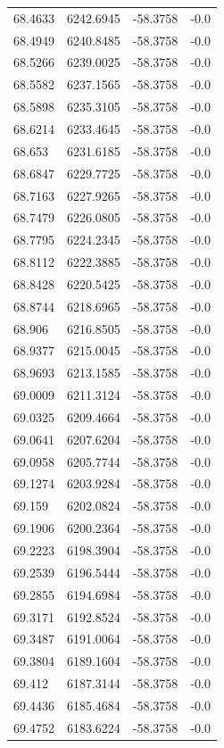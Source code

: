 \begin{table}[H]
\begin{tabular}{llll}
68.4633 & 6242.6945 & -58.3758 & -0.0 \\
68.4949 & 6240.8485 & -58.3758 & -0.0 \\
68.5266 & 6239.0025 & -58.3758 & -0.0 \\
68.5582 & 6237.1565 & -58.3758 & -0.0 \\
68.5898 & 6235.3105 & -58.3758 & -0.0 \\
68.6214 & 6233.4645 & -58.3758 & -0.0 \\
68.653 & 6231.6185 & -58.3758 & -0.0 \\
68.6847 & 6229.7725 & -58.3758 & -0.0 \\
68.7163 & 6227.9265 & -58.3758 & -0.0 \\
68.7479 & 6226.0805 & -58.3758 & -0.0 \\
68.7795 & 6224.2345 & -58.3758 & -0.0 \\
68.8112 & 6222.3885 & -58.3758 & -0.0 \\
68.8428 & 6220.5425 & -58.3758 & -0.0 \\
68.8744 & 6218.6965 & -58.3758 & -0.0 \\
68.906 & 6216.8505 & -58.3758 & -0.0 \\
68.9377 & 6215.0045 & -58.3758 & -0.0 \\
68.9693 & 6213.1585 & -58.3758 & -0.0 \\
69.0009 & 6211.3124 & -58.3758 & -0.0 \\
69.0325 & 6209.4664 & -58.3758 & -0.0 \\
69.0641 & 6207.6204 & -58.3758 & -0.0 \\
69.0958 & 6205.7744 & -58.3758 & -0.0 \\
69.1274 & 6203.9284 & -58.3758 & -0.0 \\
69.159 & 6202.0824 & -58.3758 & -0.0 \\
69.1906 & 6200.2364 & -58.3758 & -0.0 \\
69.2223 & 6198.3904 & -58.3758 & -0.0 \\
69.2539 & 6196.5444 & -58.3758 & -0.0 \\
69.2855 & 6194.6984 & -58.3758 & -0.0 \\
69.3171 & 6192.8524 & -58.3758 & -0.0 \\
69.3487 & 6191.0064 & -58.3758 & -0.0 \\
69.3804 & 6189.1604 & -58.3758 & -0.0 \\
69.412 & 6187.3144 & -58.3758 & -0.0 \\
69.4436 & 6185.4684 & -58.3758 & -0.0 \\
69.4752 & 6183.6224 & -58.3758 & -0.0 \\

\end{tabular}
\end{table}

